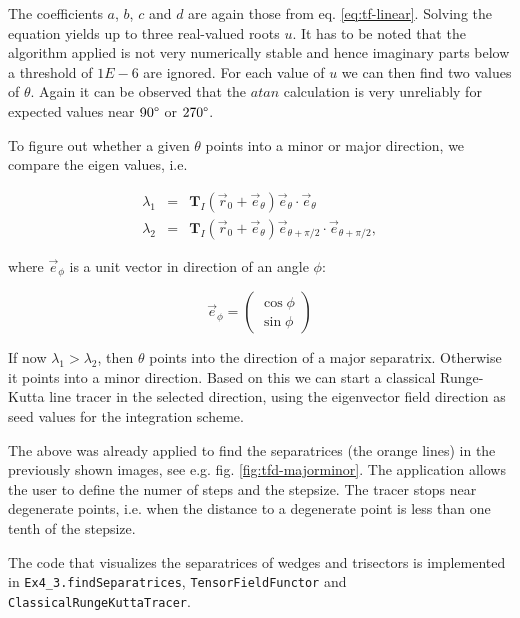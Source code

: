 \documentclass[a4paper,10pt,notitlepage]{scrartcl}
\newcommand{\mat}[1]{\mathbf{#1}}
\begin{document}
The coefficients $a$, $b$, $c$ and $d$ are again those from eq.
\ref{eq:tf-linear}. Solving the equation yields up to three real-valued roots
$u$. It has to be noted that the algorithm applied is not very numerically
stable and hence imaginary parts below a threshold of $1E-6$ are ignored. For
each value of $u$ we can then find two values of $\theta$. Again it can be
observed that the $atan$ calculation is very unreliably for expected values
near $90\degree$ or $270\degree$.

To figure out whether a given $\theta$ points into a minor or major direction,
we compare the eigen values, i.e.

\begin{eqnarray}
 \lambda_1 &=& \mat{T}_I(\vec{r}_0 + \vec{e}_\theta) \vec{e}_\theta \cdot
\vec{e}_\theta \\
 \lambda_2 &=& \mat{T}_I(\vec{r}_0 + \vec{e}_\theta) \vec{e}_{\theta+\pi/2}
\cdot
\vec{e}_{\theta+\pi/2},
\end{eqnarray}

where $\vec{e}_{\phi}$ is a unit vector in direction of an angle $\phi$:

\begin{equation}
 \vec{e}_{\phi} = \left( \begin{array}{c}
                          \cos \phi \\
                          \sin \phi
                         \end{array} \right )
\end{equation}

If now $\lambda_1 > \lambda_2$, then $\theta$ points into the direction of a
major separatrix. Otherwise it points into a minor direction. Based on this we
can start a classical Runge-Kutta line tracer in the selected direction, using
the eigenvector field direction as seed values for the integration scheme.

The above was already applied to find the separatrices (the orange lines) in the
previously shown images, see e.g. fig. \ref{fig:tfd-majorminor}. The
application allows the user to define the numer of steps and the stepsize. The
tracer stops near degenerate points, i.e. when the distance to a degenerate
point is less than one tenth of the stepsize.

The code that visualizes the separatrices of wedges and trisectors is
implemented in \texttt{Ex4\_3.findSeparatrices},
\texttt{TensorFieldFunctor} and \texttt{ClassicalRungeKuttaTracer}.


\end{document}
